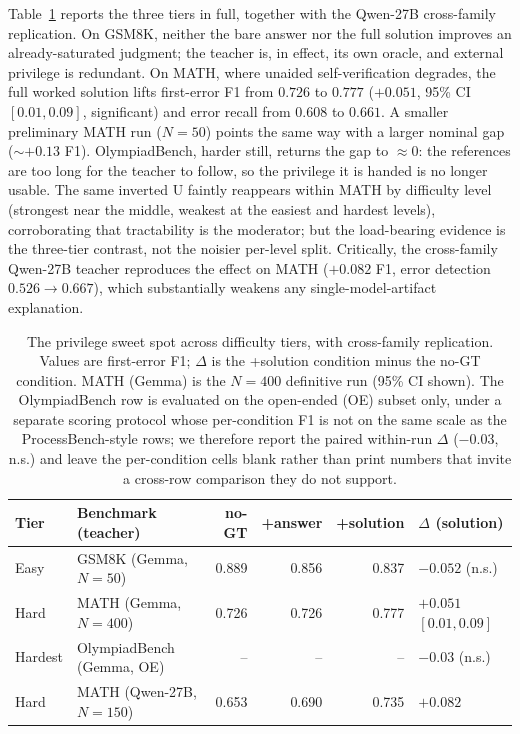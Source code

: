 \documentclass{article}
\begin{document}
Table~\ref{tab:sweetspot} reports the three tiers in full, together with the
Qwen-27B cross-family replication. On GSM8K, neither the bare answer nor the
full solution improves an already-saturated judgment; the teacher is, in
effect, its own oracle, and external privilege is redundant. On MATH, where
unaided self-verification degrades, the full worked solution lifts
first-error F1 from $0.726$ to $0.777$ ($+0.051$, 95\% CI $[0.01, 0.09]$,
significant) and error recall from $0.608$ to $0.661$. A smaller preliminary
MATH run ($N=50$) points the same way with a larger nominal gap ($\sim
+0.13$ F1). OlympiadBench, harder still, returns the gap to $\approx 0$: the
references are too long for the teacher to follow, so the privilege it is
handed is no longer usable. The same inverted U faintly reappears within
MATH by difficulty level (strongest near the middle, weakest at the easiest
and hardest levels), corroborating that tractability is the moderator; but
the load-bearing evidence is the three-tier contrast, not the noisier
per-level split. Critically, the cross-family Qwen-27B teacher reproduces
the effect on MATH ($+0.082$ F1, error detection $0.526 \to 0.667$), which
substantially weakens any single-model-artifact explanation.

\begin{table}[t]
\centering
\small
\begin{tabular}{llrrrl}
\toprule
Tier & Benchmark (teacher) & no-GT & +answer & +solution & $\Delta$ (solution) \\
\midrule
Easy & GSM8K (Gemma, $N=50$) & 0.889 & 0.856 & 0.837 & $-0.052$ (n.s.) \\
Hard & MATH (Gemma, $N=400$) & 0.726 & 0.726 & 0.777 & $\mathbf{+0.051}$ $[0.01, 0.09]$ \\
Hardest & OlympiadBench (Gemma, OE) & -- & -- & -- & $-0.03$ (n.s.) \\
\midrule
Hard & MATH (Qwen-27B, $N=150$) & 0.653 & 0.690 & 0.735 & $+0.082$ \\
\bottomrule
\end{tabular}
\caption{The privilege sweet spot across difficulty tiers, with cross-family
replication. Values are first-error F1; $\Delta$ is the +solution condition
minus the no-GT condition. MATH (Gemma) is the $N=400$ definitive run (95\%
CI shown). The OlympiadBench row is evaluated on the open-ended (OE) subset
only, under a separate scoring protocol whose per-condition F1 is not on the
same scale as the ProcessBench-style rows; we therefore report the paired
within-run $\Delta$ ($-0.03$, n.s.) and leave the per-condition cells blank
rather than print numbers that invite a cross-row comparison they do not
support.}
\label{tab:sweetspot}
\end{table}
\end{document}
